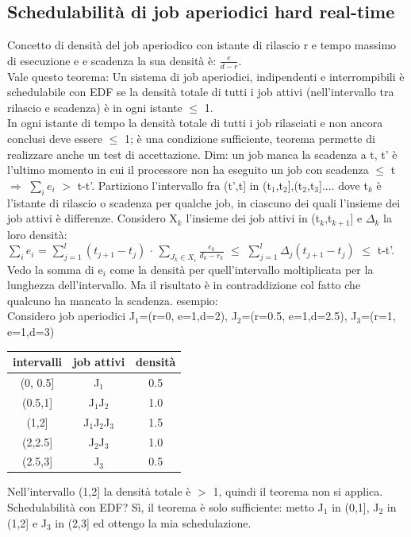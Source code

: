 \documentclass[12pt, oneside]{extbook}
\begin{document}
\subsection{Schedulabilità di job aperiodici hard real-time}
Concetto di densità del job aperiodico con istante di rilascio r e tempo massimo di esecuzione e e scadenza la sua densità è: $\frac{e}{d-r}$.\\ Vale questo teorema: Un sistema di job aperiodici, indipendenti e interrompibili è schedulabile con EDF se la densità totale di tutti i job attivi (nell'intervallo tra rilascio e scadenza) è in ogni istante $\leq$ 1.\\ In ogni istante di tempo la densità totale di tutti i job rilasciati e non ancora conclusi deve essere $\leq$ 1; è una condizione sufficiente, teorema permette di realizzare anche un test di accettazione. Dim: un job manca la scadenza a t, t' è l'ultimo momento in cui il processore non ha eseguito un job con scadenza $\leq$ t $\Rightarrow$ $\sum\limits_{i} e_i$ $>$ t-t'. Partiziono l'intervallo fra (t',t] in (t$_{1}$,t$_{2}$],(t$_{2}$,t$_{3}$].... dove t$_{k}$ è l'istante di rilascio o scadenza per qualche job, in ciascuno dei quali l'insieme dei job attivi è differenze. Considero X$_{k}$ l'insieme dei job attivi in (t$_{k}$,t$_{k+1}$] e $\Delta_k$ la loro densità:\\ $\sum\limits_{i} e_i$ =  $\sum\limits_{j = 1}^{l} (t_{j+1} - t_j)$ $\cdot$ $\sum\limits_{J_{k} \in X_{i}} \frac{e_k}{d_k - r_k}$ $\leq$ $\sum\limits_{j = 1}^{l} \Delta_{j}(t_{j+1} - t_j)$ $\leq$ t-t'. Vedo la somma di e$_{i}$ come la densità per quell'intervallo moltiplicata per la lunghezza dell'intervallo. Ma il risultato è in contraddizione col fatto che qualcuno ha mancato la scadenza. esempio: \\
Considero job aperiodici J$_{1}$=(r=0, e=1,d=2), J$_{2}$=(r=0.5, e=1,d=2.5), J$_{3}$=(r=1, e=1,d=3)\\
\begin{table}
\begin{tabular}{||c c c||}
\hline\hline
intervalli & job attivi & densità\\
\hline
(0, 0.5] & J$_{1}$ & 0.5\\
\hline
(0.5,1] & J$_{1}$J$_{2}$ & 1.0\\
\hline
(1,2] & J$_{1}$J$_{2}$J$_{3}$ & 1.5\\
\hline
(2,2.5] & J$_{2}$J$_{3}$ & 1.0\\
\hline
(2.5,3] & J$_{3}$ & 0.5
\end{tabular}
\end{table}
Nell'intervallo (1,2] la densità totale è $>$ 1, quindi il teorema non si applica. Schedulabilità con EDF? Sì, il teorema è solo sufficiente: metto J$_{1}$ in (0,1], J$_{2}$ in (1,2] e J$_{3}$ in (2,3] ed ottengo la mia schedulazione.
\end{document}
